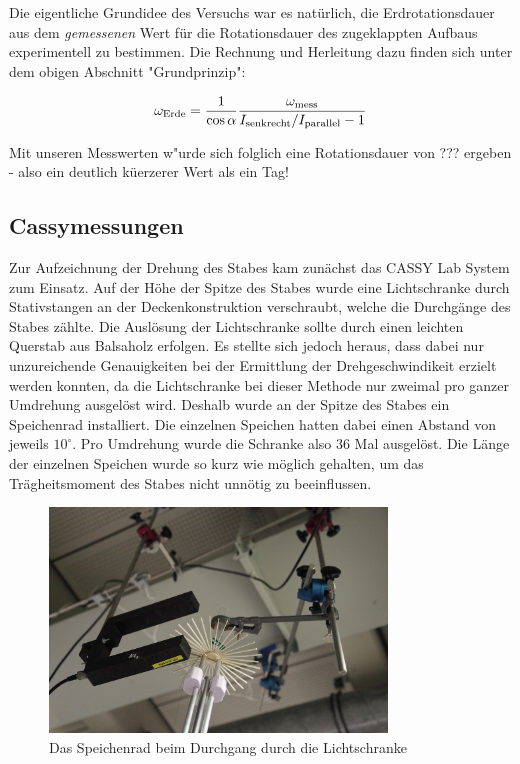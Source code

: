 \documentclass[11pt]{scrartcl}
\newcommand{\ltext}[1]{\ensuremath{_{\textnormal{#1}}}}
\begin{document}
Die eigentliche Grundidee des Versuchs war es nat\"urlich, die Erdrotationsdauer aus dem \textit{gemessenen} Wert f\"ur die Rotationsdauer des zugeklappten Aufbaus experimentell zu bestimmen. Die Rechnung und Herleitung dazu finden sich unter dem obigen Abschnitt "Grundprinzip":

\[\omega\ltext{Erde} = 
\frac{1}{\cos\alpha}
\frac{\omega\ltext{mess}}{I\ltext{senkrecht} / I\ltext{parallel} - 1}\]

Mit unseren Messwerten w"urde sich folglich eine Rotationsdauer von ??? ergeben - also ein deutlich k\"uerzerer Wert als ein Tag!

\subsection{Cassymessungen} %
Zur Aufzeichnung der Drehung des Stabes kam zun\"achst das CASSY Lab System zum Einsatz. Auf der H\"ohe der Spitze des Stabes wurde eine Lichtschranke durch Stativstangen an der Deckenkonstruktion verschraubt, welche die Durchg\"ange des Stabes z\"ahlte. Die Ausl\"osung der Lichtschranke sollte durch einen leichten Querstab aus Balsaholz erfolgen. Es stellte sich jedoch heraus, dass dabei nur unzureichende Genauigkeiten bei der Ermittlung der Drehgeschwindikeit erzielt werden konnten, da die Lichtschranke bei dieser Methode nur zweimal pro ganzer Umdrehung ausgel\"ost wird. Deshalb wurde an der Spitze des Stabes ein \glqq Speichenrad\grqq{} installiert. Die einzelnen Speichen hatten dabei einen Abstand von jeweils $10^\circ$. Pro Umdrehung wurde die Schranke also 36 Mal ausgel\"ost. Die L\"ange der einzelnen Speichen wurde so kurz wie m\"oglich gehalten, um das Tr\"agheitsmoment des Stabes nicht unn\"otig zu beeinflussen.
\begin{figure}[ht]
\begin{center}
\includegraphics[width=0.8\textwidth]{lichtschranke.jpg}
\end{center}
\vspace{-1.5\baselineskip}
\caption{Das Speichenrad beim Durchgang durch die Lichtschranke}
\label{lichtschranke}
\end{figure}
\end{document}
